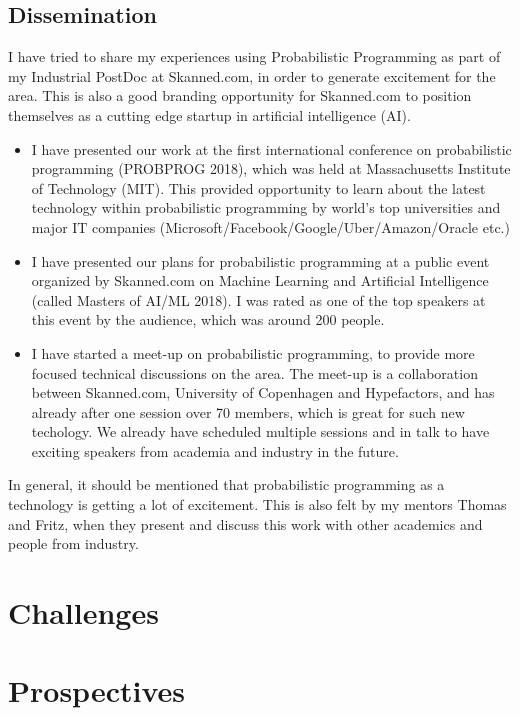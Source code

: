 \documentclass[12pt,a4paper]{article}
\begin{document}
\subsection{Dissemination}
I have tried to share my experiences using Probabilistic Programming as part of
my Industrial PostDoc at Skanned.com, in order to generate excitement for the
area. This is also a good branding opportunity for Skanned.com to position
themselves as a cutting edge startup in artificial intelligence (AI).
\begin{itemize}
\item I have presented our work at the first international conference on
  probabilistic programming (PROBPROG 2018), which was held at Massachusetts Institute of
  Technology (MIT). This provided opportunity to learn about the latest
  technology within probabilistic programming by world's top universities and
  major IT companies (Microsoft/Facebook/Google/Uber/Amazon/Oracle etc.)
\item I have presented our plans for probabilistic programming at a public event
  organized by Skanned.com on Machine Learning and Artificial Intelligence
  (called Masters of AI/ML 2018). I was rated as one of the top speakers at this
  event by the audience, which was around 200 people.
\item I have started a meet-up on probabilistic programming, to provide more
  focused technical discussions on the area. The meet-up is a collaboration
  between Skanned.com, University of Copenhagen and Hypefactors, and has already
  after one session over 70 members, which is great for such new techology. We
  already have scheduled multiple sessions and in talk to have exciting speakers from
  academia and industry in the future.
\end{itemize}
In general, it should be mentioned that probabilistic programming as a
technology is getting a lot of excitement. This is also felt by my mentors
Thomas and Fritz, when they present and discuss this work with other academics
and people from industry.

\section{Challenges}

\section{Prospectives}

\medskip

\printbibliography[
heading=bibintoc,
title={Bibliography}
] 

\clearpage
\end{document}
